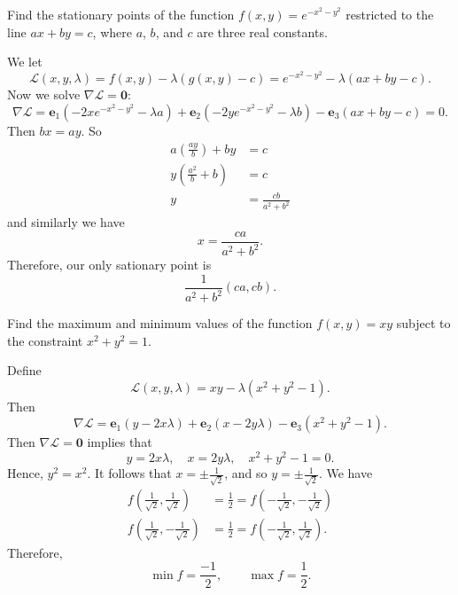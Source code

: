 
\setcounter{question}{57}
\question Find the stationary points of the function $f(x, y) = e^{-x^2 - y^2}$ restricted to the line $ax + by = c$, where $a$, $b$, and $c$ are three real constants.
\begin{solution}
    We let
    \[ 
        \mathcal L(x, y, \lambda) = 
        f(x, y) - \lambda (g(x, y) - c) = 
        e^{-x^2 - y^2} - \lambda(ax + by - c). 
    \]
    Now we solve $\nabla \mathcal L = \bm 0$:
    \[
        \nabla \mathcal L =
        \bm e_1 (-2xe^{-x^2 - y^2} - \lambda a) +
        \bm e_2 (-2ye^{-x^2 - y^2} - \lambda b) -
        \bm e_3 (ax + by - c) = 0.
    \]
    Then $bx = ay$. So
    \begin{align*}
        a\left(\frac{ay}b\right) + by &= c \\
        y\left(\frac{a^2}b + b\right) &= c \\
        y &= \frac{cb}{a^2 + b^2}
    \end{align*}
    and similarly we have
    \[ x = \frac{ca}{a^2 + b^2}. \]
    Therefore, our only sationary point is
    \[ \frac1{a^2 + b^2} (ca, cb). \]
\end{solution}

\question Find the maximum and minimum values of the function $f(x, y) = xy$ subject to the constraint $x^2 + y^2 = 1$.
\begin{solution}
    Define
    \[ \mathcal L(x, y, \lambda) = xy - \lambda(x^2 + y^2 - 1). \]
    Then
    \[ 
        \nabla \mathcal L = 
        \bm e_1 (y - 2x\lambda) + 
        \bm e_2 (x - 2y\lambda) - 
        \bm e_3 (x^2 + y^2 - 1). 
    \]
    Then $\nabla \mathcal L = \bm 0$ implies that
    \[ y = 2x\lambda, \quad x = 2y\lambda, \quad x^2 + y^2 - 1 = 0. \]
    Hence, $y^2 = x^2$. 
    It follows that $x = \pm \frac1{\sqrt2}$, and so $y = \pm \frac1{\sqrt2}$.
    We have
    \begin{align*}
        f\left(\frac1{\sqrt2}, \frac1{\sqrt2}\right) &= \frac12 = f\left(-\frac1{\sqrt2},-\frac1{\sqrt2}\right) \\
        f\left(\frac1{\sqrt2}, -\frac1{\sqrt2}\right) &= \frac12 = f\left(-\frac1{\sqrt2}, \frac1{\sqrt2}\right).
    \end{align*}
    Therefore, 
    \[ \min f = \frac{-1}2, \qquad \max f = \frac12. \]
\end{solution}
